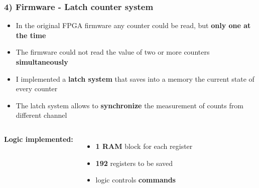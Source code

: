 \documentclass[aspectratio=169]{beamer}
\begin{document}
	\begin{frame}
		\frametitle{4) Firmware - Latch counter system}
		\begin{itemize}
			\item In the original FPGA firmware any counter could be read, but \textbf{only one at the time}
			\item The firmware could not read the value of two or more counters \textbf{simultaneously}
			\item I implemented a \textbf{latch system} that saves into a memory the current state of every counter
			\item The latch system allows to \textbf{synchronize} the measurement of counts from different channel
		\end{itemize}
		\begin{columns}
			{\color{blue} \textbf{Logic implemented:}}
			\begin{itemize}
				\item \textbf{1 RAM} block for each register
				\item \textbf{192} registers to be saved
				\item logic controls \textbf{commands}
			\end{itemize}
			\begin{center}

\end{center}
\end{columns}
\end{frame}
\end{document}
